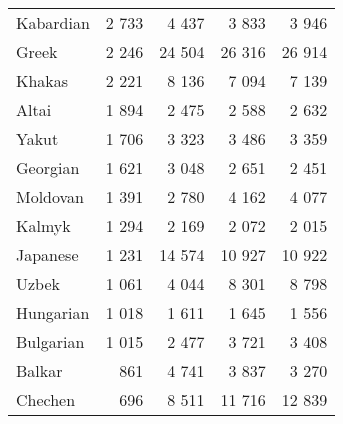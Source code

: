 \begin{table}[!h]
\begin{tabular}{lrrrr}
Kabardian & 2 733 & 4 437 & 3 833 & 3 946\\
Greek & 2 246 & 24 504 & 26 316 & 26 914\\
Khakas & 2 221 & 8 136 & 7 094 & 7 139\\
Altai & 1 894 & 2 475 & 2 588 & 2 632\\
Yakut & 1 706 & 3 323 & 3 486 & 3 359\\
Georgian & 1 621 & 3 048 & 2 651 & 2 451\\
Moldovan & 1 391 & 2 780 & 4 162 & 4 077\\
Kalmyk & 1 294 & 2 169 & 2 072 & 2 015\\
Japanese & 1 231 & 14 574 & 10 927 & 10 922\\
Uzbek & 1 061 & 4 044 & 8 301 & 8 798\\
Hungarian & 1 018 & 1 611 & 1 645 & 1 556\\
Bulgarian & 1 015 & 2 477 & 3 721 & 3 408\\
Balkar & 861 & 4 741 & 3 837 & 3 270\\
Chechen & 696 & 8 511 & 11 716 & 12 839\\
\bottomrule
\end{tabular}
\end{table}